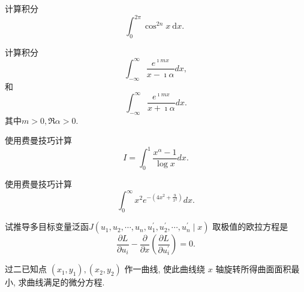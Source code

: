 \documentclass[10pt]{article}
\newenvironment{problem}[2][]{\begin{trivlist}
\item[\hskip \labelsep {\bfseries #1}\hskip \labelsep {\bfseries #2}]}{\end{trivlist}}
\begin{document}
\renewcommand{\labelenumi}{(\arabic{enumi})}
\renewcommand{\labelenumii}{(\arabic{enumi}.\arabic{enumii})}



 




\begin{problem}{5.1}
计算积分
$$
\int_0^{2 \pi} \cos ^{2 n} x \mathrm{~d} x \text {. }
$$
\end{problem}

\begin{problem}{5.2}
  计算积分
  $$
  \int_{-\infty}^{\infty} \frac{e^{\imath m x}}{x-\imath \alpha} d x,
  $$
  和
  $$
  \int_{-\infty}^{\infty} \frac{e^{\imath m x}}{x+\imath \alpha} d x.
  $$
  其中$m>0, \Re \alpha > 0$.
  \end{problem}
  
\begin{problem}{5.3}
    使用费曼技巧计算
    $$
    I = \int_0^1 \frac{x^\alpha-1}{\log x} d x . 
    $$
  \end{problem}
   
\begin{problem}{5.4}
     使用费曼技巧计算
     $$
     \int_0^{\infty} x^2 e^{-\left(4 x^2+\frac{9}{x^2}\right)} d x .
     $$
\end{problem}

\begin{problem}{5.5}
试推导多目标变量泛函$J\left(u_1, u_2, \cdots, u_n, u_1^{\prime}, u_2^{\prime}, \cdots, u_n^{\prime} \mid x\right)$
取极值的欧拉方程是
$$
\frac{\partial L}{\partial u_i}-\frac{\partial}{\partial x}\left(\frac{\partial L}{\partial u_i^{\prime}}\right)=0 .
$$
\end{problem}


\begin{problem}{5.6}
  过二已知点 $\left(x_1, y_1\right),\left(x_2, y_2\right)$ 作一曲线, 使此曲线绕 $x$ 轴旋转所得曲面面积最小, 求曲线满足的微分方程.
\end{problem}
\end{document}
